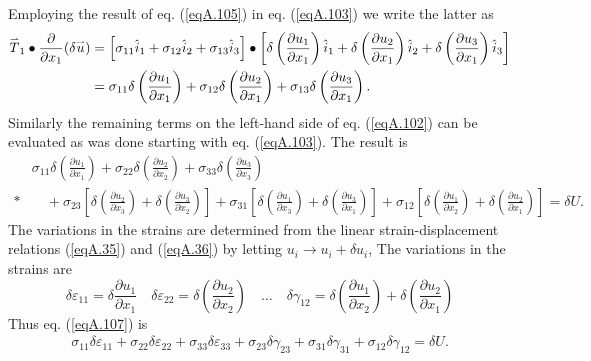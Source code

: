 \documentclass{AeroStructure-ERJohnson}
\def\harp#1{\smash{\mathord{\buildrel{\lower3pt\hbox{$\scriptscriptstyle\rightharpoonup$}}\over{#1}}}}
\begin{document}
Employing the result of eq. (\ref{eqA.105}) in eq. (\ref{eqA.103}) we write the latter as
\begin{align}\label{eqA.106}
\harp{T}_{1} \bullet \frac{\partial}{\partial x_{1}}(\delta \harp{u}) &=\left[\sigma_{11} \hat{i}_{1}+\sigma_{12} \hat{i}_{2}+\sigma_{13} \hat{i}_{3}\right] \bullet\left[\delta\left(\frac{\partial u_{1}}{\partial x_{1}}\right) \hat{i}_{1}+\delta\left(\frac{\partial u_{2}}{\partial x_{1}}\right) \hat{i}_{2}+\delta\left(\frac{\partial u_{3}}{\partial x_{1}}\right) \hat{i}_{3}\right] \nonumber\\
&=\sigma_{11} \delta\left(\frac{\partial u_{1}}{\partial x_{1}}\right)+\sigma_{12} \delta\left(\frac{\partial u_{2}}{\partial x_{1}}\right)+\sigma_{13} \delta\left(\frac{\partial u_{3}}{\partial x_{1}}\right).
\end{align}
Similarly the remaining terms on the left-hand side of eq. (\ref{eqA.102}) can be evaluated as was done starting with eq. (\ref{eqA.103}). The result is
\begin{align}\label{eqA.107}
&\sigma_{11} \delta\left(\frac{\partial u_{1}}{\partial x_{1}}\right)+\sigma_{22} \delta\left(\frac{\partial u_{2}}{\partial x_{2}}\right)+\sigma_{33} \delta\left(\frac{\partial u_{3}}{\partial x_{3}}\right)\nonumber\\*
&\quad+\sigma_{23}\left[\delta\left(\frac{\partial u_{2}}{\partial x_{3}}\right)+\delta\left(\frac{\partial u_{3}}{\partial x_{2}}\right)\right]+\sigma_{31}\left[\delta\left(\frac{\partial u_{1}}{\partial x_{3}}\right)+\delta\left(\frac{\partial u_{3}}{\partial x_{1}}\right)\right]+\sigma_{12}\left[\delta\left(\frac{\partial u_{1}}{\partial x_{2}}\right)+\delta\left(\frac{\partial u_{2}}{\partial x_{1}}\right)\right]=\delta U.
\end{align}
The variations in the strains are determined from the linear strain-displacement relations (\ref{eqA.35}) and (\ref{eqA.36}) by letting $u_{i} \rightarrow u_{i}+\delta u_{i}$, The variations in the strains are
\[
\delta \varepsilon_{11}=\delta \frac{\partial u_{1}}{\partial x_{1}} \quad \delta \varepsilon_{22}=\delta\left(\frac{\partial u_{2}}{\partial x_{2}}\right) \quad \ldots \quad \delta \gamma_{12}=\delta\left(\frac{\partial u_{1}}{\partial x_{2}}\right)+\delta\left(\frac{\partial u_{2}}{\partial x_{1}}\right)
\]
Thus eq. (\ref{eqA.107}) is
\begin{align}\label{eqA.108}
\sigma_{11} \delta \varepsilon_{11}+\sigma_{22} \delta \varepsilon_{22}+\sigma_{33} \delta \varepsilon_{33}+\sigma_{23} \delta \gamma_{23}+\sigma_{31} \delta \gamma_{31}+\sigma_{12} \delta \gamma_{12}=\delta U.
\end{align}
\end{document}
